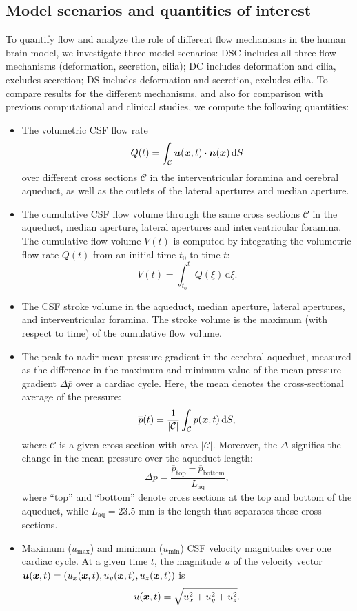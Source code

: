 \documentclass{template}
\begin{document}
\subsection{Model scenarios and quantities of interest}
To quantify flow and analyze the role of different flow mechanisms
in the human brain model, we investigate three model scenarios:
DSC includes all three flow mechanisms (deformation, secretion, cilia);
DC includes deformation and cilia, excludes secretion;
DS includes deformation and secretion, excludes cilia.
To compare results for the different mechanisms, and
also for comparison with previous computational and clinical studies,
we compute the following quantities:
\begin{itemize}
    \item The volumetric CSF flow rate
    $$ Q(t) = \int_{\mathcal{C}}\bm{u}(\bm{x}, t)\cdot\bm{n}(\bm{x})\,\mathrm dS $$
    over different cross sections $\mathcal{C}$ in the interventricular foramina and cerebral aqueduct, 
    as well as the outlets of the lateral apertures and median aperture.

    \item The cumulative CSF flow volume through the same cross sections
    $\mathcal{C}$ in the aqueduct,
    median aperture, lateral apertures
    and interventricular foramina. The cumulative flow volume $V(t)$
    is computed by integrating the volumetric flow rate $Q(t)$
    from an initial time $t_0$ to time $t$:
    $$ V(t) = \int_{t_0}^{t} Q(\xi)\,\mathrm d\xi.$$

    \item The CSF stroke volume in the aqueduct, median aperture, lateral apertures,
    and interventricular foramina. The stroke volume is the maximum (with respect
    to time) of the cumulative flow volume.

    \item The peak-to-nadir mean pressure gradient in the cerebral aqueduct,
    measured as the difference in the maximum and minimum value of
    the mean pressure gradient $\Delta \overline{p}$ over a cardiac cycle.
    Here, the mean denotes the cross-sectional average of the pressure:
    $$\overline{p}(t) = \frac{1}{|\mathcal{C}|}\int_{\mathcal{C}} p(\bm{x}, t)\,\mathrm dS,$$
    where $\mathcal{C}$ is a given cross section with area $|\mathcal{C}|$.
    Moreover, the $\Delta$ signifies the change in the mean pressure over the
    aqueduct length:
    $$ \Delta \overline{p} = \frac{\overline{p}_{\mathrm{top}} - \overline{p}_{\mathrm{bottom}}}{L_{\mathrm{aq}}},$$
    where ``top'' and ``bottom'' denote cross sections at the top and bottom of the aqueduct,
    while $L_{\mathrm{aq}} = 23.5$ mm is the length that separates these cross sections.

    \item Maximum ($u_{\mathrm{max}}$) and minimum ($u_{\mathrm{min}}$)
    CSF velocity magnitudes over one cardiac cycle.
    At a given time $t$, the magnitude $u$ of the velocity vector
    $\bm{u}(\bm{x}, t) = (u_x(\bm{x}, t), u_y(\bm{x}, t), u_z(\bm{x}, t))$ is 
    $$ u(\bm{x}, t) = \sqrt{u_{x}^2 + u_{y}^2 + u_{z}^2}. $$
\end{itemize}
\end{document}
